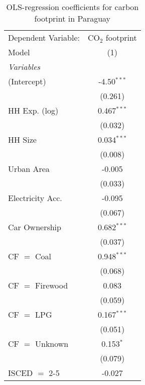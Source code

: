 
\begin{table}[htbp!]
   \centering
   \small
   \begin{adjustbox}{width = 1\textwidth, max height = 0.95\textheight, center}
      \begin{threeparttable}[b]
         \caption{\label{tab:OLS_2_PRY} OLS-regression coefficients for carbon footprint in Paraguay}
         \begin{tabular}{lc}
            \tabularnewline \midrule \midrule
            Dependent Variable: & CO$_{2}$ footprint\\  
            Model               & (1)\\  
            \midrule
            \emph{Variables}\\
            (Intercept)         & -4.50$^{***}$\\   
                                & (0.261)\\   
            HH Exp. (log)       & 0.467$^{***}$\\   
                                & (0.032)\\   
            HH Size             & 0.034$^{***}$\\   
                                & (0.008)\\   
            Urban Area          & -0.005\\   
                                & (0.033)\\   
            Electricity Acc.    & -0.095\\   
                                & (0.067)\\   
            Car Ownership       & 0.682$^{***}$\\   
                                & (0.037)\\   
            CF $=$ Coal         & 0.948$^{***}$\\   
                                & (0.068)\\   
            CF $=$ Firewood     & 0.083\\   
                                & (0.059)\\   
            CF $=$ LPG          & 0.167$^{***}$\\   
                                & (0.051)\\   
            CF $=$ Unknown      & 0.153$^{*}$\\   
                                & (0.079)\\   
            ISCED $=$ 2-5       & -0.027\\   

\end{tabular}
\end{threeparttable}
\end{adjustbox}
\end{table}
